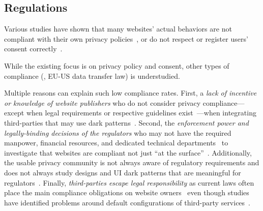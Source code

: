 
\subsection{Regulations}
\label{sec:compliance}

Various studies have shown that many websites' actual behaviors are not compliant with their own privacy policies~\cite{libertAutomatedApproachAuditing2018,ouViopolicyDetectorAutomatedApproach2022}, or do not respect or register users’ %
consent correctly~\cite{carpinetoAutomaticAssessmentWebsite2016,sanchezrolaCanIOptOutYet2019,matteCookieBannersRespect2020,mehrnezhadCrossPlatformEvaluationPrivacy2020,bouhoulaAutomatedLargeScaleAnalysis2024,vannortwickSettingBarLow2022,birrellSoKTechnicalImplementation2024,Kanc-etal-25-PETs}.

\begin{opbox}
While the existing focus is on privacy policy and consent, other types of compliance (\eg{}, EU-US data transfer law) is understudied.
\end{opbox}


Multiple reasons can explain such low compliance rates. First, a \textit{lack of incentive or knowledge of website publishers} who do not consider privacy compliance---except when legal requirements or respective guidelines exist~\cite{utzPrivacyRarelyConsidered2023,Stov-etal-23-PETs}---when integrating third-parties that may use dark patterns~\cite{tothDarkPatternsManipulation2022,grayDarkPatternsLegal2021}. Second, the \textit{enforcement power and legally-binding decisions of the regulators} who may not have the required manpower, financial resources, and dedicated technical departments~\cite{edpbContributionEDPBReport2023} to investigate that websites are compliant not just ``at the surface''~\cite{kyiInvestigatingDeceptiveDesign2023}. Additionally, the usable privacy community is not always aware of regulatory requirements and does not always study designs and UI dark patterns that are meaningful for regulators~\cite{Bielova2024-zr}. 
Finally, \textit{third-parties escape legal responsibility} as current laws often place the main compliance obligations on website owners~\cite{santosConsentManagementPlatforms2021} even though studies have identified problems around default configurations of third-party services~\cite{Koch-etal-25-PETs,Rodr-etal-25-PETs}.

